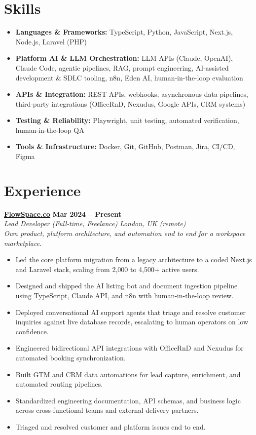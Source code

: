 \documentclass[a4paper,10pt]{article}
\newcommand{\role}[4]{%
 \textbf{#1} \hfill \textbf{#2}\\[1pt]%
 \textit{#3} \hfill \textit{#4}\\[2pt]%
}
\begin{document}
\section{Skills}
\begin{itemize}
 \item \textbf{Languages \& Frameworks:} TypeScript, Python, JavaScript, Next.js, Node.js, Laravel (PHP)
 \item \textbf{Platform AI \& LLM Orchestration:} LLM APIs (Claude, OpenAI), Claude Code, agentic pipelines, RAG, prompt engineering, AI-assisted development \& SDLC tooling, n8n, Eden AI, human-in-the-loop evaluation
 \item \textbf{APIs \& Integration:} REST APIs, webhooks, asynchronous data pipelines, third-party integrations (OfficeRnD, Nexudus, Google APIs, CRM systems)
 \item \textbf{Testing \& Reliability:} Playwright, unit testing, automated verification, human-in-the-loop QA
 \item \textbf{Tools \& Infrastructure:} Docker, Git, GitHub, Postman, Jira, CI/CD, Figma
\end{itemize}

\section{Experience}

\role{\href{https://flowspace.co}{FlowSpace.co}}{Mar 2024 -- Present}{Lead Developer (Full-time, Freelance)}{London, UK (remote)}
\textit{Own product, platform architecture, and automation end to end for a workspace marketplace.}
\begin{itemize}
 \item Led the core platform migration from a legacy architecture to a coded Next.js and Laravel stack, scaling from 2,000 to 4,500+ active users.
 \item Designed and shipped the AI listing bot and document ingestion pipeline using TypeScript, Claude API, and n8n with human-in-the-loop review.
 \item Deployed conversational AI support agents that triage and resolve customer inquiries against live database records, escalating to human operators on low confidence.
 \item Engineered bidirectional API integrations with OfficeRnD and Nexudus for automated booking synchronization.
 \item Built GTM and CRM data automations for lead capture, enrichment, and automated routing pipelines.
 \item Standardized engineering documentation, API schemas, and business logic across cross-functional teams and external delivery partners.
 \item Triaged and resolved customer and platform issues end to end.
\end{itemize}
\end{document}
